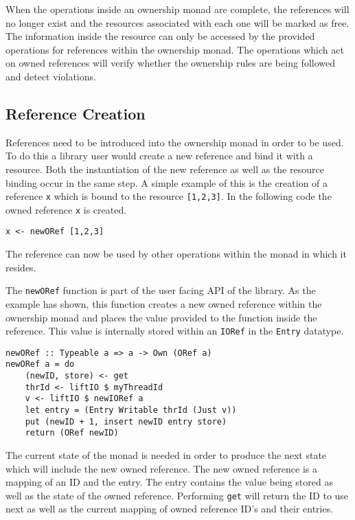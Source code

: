 \documentclass[onehalf,11pt]{beavtex}
\begin{document}
When the operations inside an ownership monad are complete, the references
will no longer exist and the resources associated with each one will be marked
as free.
The information inside the resource can only be accessed by the provided
operations for references within the ownership monad.
The operations which act on owned references will verify whether the ownership
rules are being followed and detect violations.


\subsection{Reference Creation}

References need to be introduced into the ownership monad in order to be used.
To do this a library user would create a new reference and bind it with a
resource.
Both the instantiation of the new reference as well as the resource binding
occur in the same step.
A simple example of this is the creation of a reference \texttt{x} which is
bound to the resource \texttt{[1,2,3]}.
In the following code the owned reference \texttt{x} is created.
\begin{verbatim}
x <- newORef [1,2,3]
\end{verbatim}
The reference can now be used by other operations within the monad in which
it resides.

The \texttt{newORef} function is part of the user facing API of the library.
As the example has shown, this function creates a new owned reference
within the ownership monad and places the value provided to the function
inside the reference. This value is internally stored within an \texttt{IORef}
in the \texttt{Entry} datatype.

\begin{verbatim}
newORef :: Typeable a => a -> Own (ORef a)
newORef a = do
    (newID, store) <- get
    thrId <- liftIO $ myThreadId
    v <- liftIO $ newIORef a
    let entry = (Entry Writable thrId (Just v))
    put (newID + 1, insert newID entry store)
    return (ORef newID)
\end{verbatim}

The current state of the monad is needed in order to produce the next state
which will include the new owned reference.
The new owned reference is a mapping of an ID and the entry. The entry
contains the value being stored as well as the state of the owned reference.
Performing \texttt{get} will return the ID to use next as well as the current
mapping of owned reference ID's and their entries.
\end{document}
